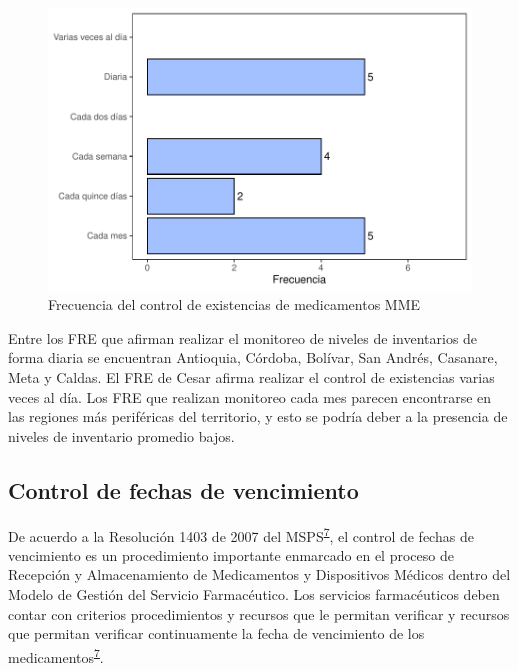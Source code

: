 \documentclass[
]{book}
\begin{document}
\begin{figure}
\includegraphics[width=1\linewidth]{InformeFinal_files/figure-latex/FrecControlExistencias-1} \caption{Frecuencia del control de existencias de medicamentos MME}\label{fig:FrecControlExistencias}
\end{figure}

Entre los FRE que afirman realizar el monitoreo de niveles de inventarios de forma diaria se encuentran Antioquia, Córdoba, Bolívar, San Andrés, Casanare, Meta y Caldas. El FRE de Cesar afirma realizar el control de existencias varias veces al día. Los FRE que realizan monitoreo cada mes parecen encontrarse en las regiones más periféricas del territorio, y esto se podría deber a la presencia de niveles de inventario promedio bajos.

\hypertarget{control-de-fechas-de-vencimiento}{%
\subsection{Control de fechas de vencimiento}\label{control-de-fechas-de-vencimiento}}

De acuerdo a la Resolución 1403 de 2007 del MSPS\textsuperscript{\protect\hyperlink{ref-MinisteriodeSaludyProteccionSocial2007}{7}}, el control de fechas de vencimiento es un procedimiento importante enmarcado en el proceso de Recepción y Almacenamiento de Medicamentos y Dispositivos Médicos dentro del Modelo de Gestión del Servicio Farmacéutico. Los servicios farmacéuticos deben contar con criterios procedimientos y recursos que le permitan verificar y recursos que permitan verificar continuamente la fecha de vencimiento de los medicamentos\textsuperscript{\protect\hyperlink{ref-MinisteriodeSaludyProteccionSocial2007}{7}}.
\end{document}
